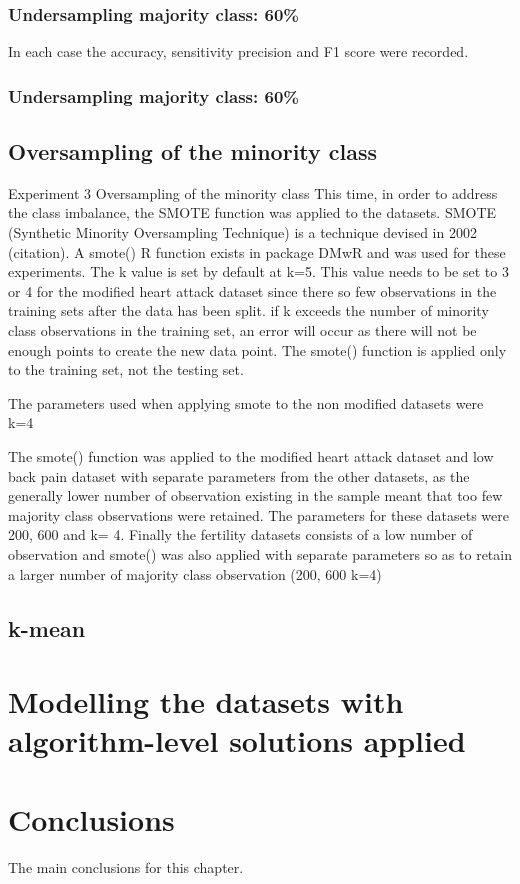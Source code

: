 \subsubsection{Undersampling majority class: 60\%}
In each case the accuracy, sensitivity precision and F1 score were recorded.\newline

\subsubsection{Undersampling majority class: 60\%}

\subsection{Oversampling of the minority class}
Experiment 3 Oversampling of the minority class
This time, in order to address the class imbalance, the SMOTE function was applied to the datasets. SMOTE (Synthetic Minority Oversampling Technique) is a technique devised in 2002 (citation). A smote()  R function exists in package DMwR and was used for these experiments.\newline
The k value is set by default at k=5. This value needs to be set to 3 or 4 for the modified heart attack dataset since there so few observations in the training sets after the data has been split. if k exceeds the number of minority class observations in the training set, an error will occur as there will not be enough points to create the new data point.\newline
The smote() function is applied only to the training set, not the testing set.\newline

The parameters used when applying smote to the non modified datasets were  k=4


The smote() function was applied to the modified heart attack dataset and low back pain dataset with separate parameters from the other datasets, as the generally lower number of observation existing in the sample meant that too few majority class observations were retained. The parameters for these datasets were 200, 600 and k= 4.
Finally the fertility datasets consists of a low number of observation and smote() was also applied with separate parameters so as to retain a larger number of majority class observation (200, 600 k=4) %




 



\subsection{k-mean}


\section{Modelling the datasets with algorithm-level solutions applied}

\section{Conclusions}

The main conclusions for this chapter.


